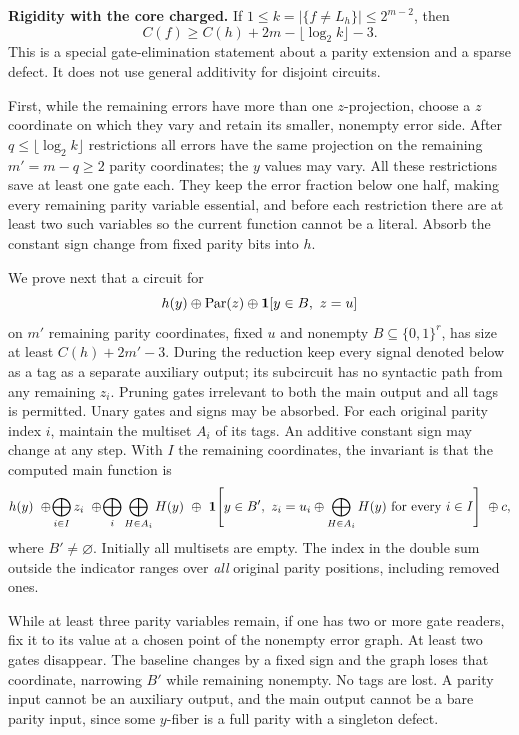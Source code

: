 \documentclass[11pt]{article}
\begin{document}
\textbf{Rigidity with the core charged.} If \(1\le k=|\{f\ne L_h\}|\le 2^{m-2}\), then
\[
                    C(f)\ge C(h)+2m-\lfloor\log_2 k\rfloor-3. \tag{A.1}
\]
This is a special gate-elimination statement about a parity extension and a sparse defect. It does not use general additivity for disjoint circuits.

First, while the remaining errors have more than one \(z\)-projection, choose a \(z\) coordinate on which they vary and retain its smaller, nonempty error side. After \(q\le\lfloor\log_2 k\rfloor\) restrictions all errors have the same projection on the remaining \(m'=m-q\ge2\) parity coordinates; the \(y\) values may vary. All these restrictions save at least one gate each. They keep the error fraction below one half, making every remaining parity variable essential, and before each restriction there are at least two such variables so the current function cannot be a literal. Absorb the constant sign change from fixed parity bits into \(h\).

We prove next that a circuit for
\[
 h(y)\oplus {\rm Par}(z)\oplus {\bf1}[y\in B,\ z=u]
\]
on \(m'\) remaining parity coordinates, fixed \(u\) and nonempty \(B\subseteq\{0,1\}^r\), has size at least \(C(h)+2m'-3\). During the reduction keep every signal denoted below as a tag as a separate auxiliary output; its subcircuit has no syntactic path from any remaining \(z_i\). Pruning gates irrelevant to both the main output and all tags is permitted. Unary gates and signs may be absorbed. For each original parity index \(i\), maintain the multiset \(A_i\) of its tags. An additive constant sign may change at any step. With \(I\) the remaining coordinates, the invariant is that the computed main function is
\[
 h(y)\ \oplus\! \bigoplus_{i\in I}z_i\
 \oplus\! \bigoplus_i\bigoplus_{H\in A_i}H(y)
 \ \oplus\ {\bf1}\!\left[y\in B',\
    z_i=u_i\oplus\bigoplus_{H\in A_i}H(y)\ {\rm for\ every}\ i\in I\right]
 \ \oplus c ,
\]
where \(B'\ne\varnothing\). Initially all multisets are empty. The index in the double sum outside the indicator ranges over \emph{all} original parity positions, including removed ones.

While at least three parity variables remain, if one has two or more gate readers, fix it to its value at a chosen point of the nonempty error graph. At least two gates disappear. The baseline changes by a fixed sign and the graph loses that coordinate, narrowing \(B'\) while remaining nonempty. No tags are lost. A parity input cannot be an auxiliary output, and the main output cannot be a bare parity input, since some \(y\)-fiber is a full parity with a singleton defect.
\end{document}
